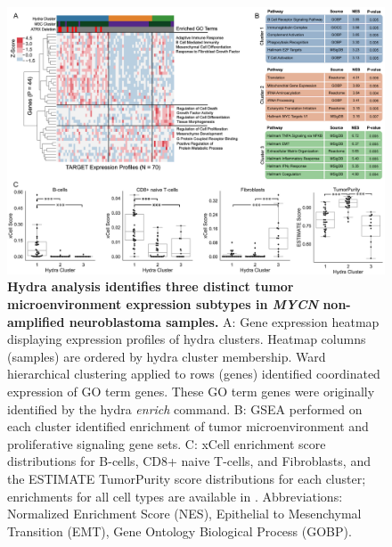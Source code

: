 \documentclass[10pt,letterpaper]{article}
\begin{document}
\begin{figure}[!h]
	\includegraphics[width=\textwidth]{img/PNG/MYCN-NA-Figure-V5@2x}
	\caption{{\bf Hydra analysis identifies three distinct tumor microenvironment expression subtypes in \textit{MYCN} non-amplified neuroblastoma samples.}
	A: Gene expression heatmap displaying expression profiles of hydra clusters. Heatmap columns (samples) are ordered by hydra cluster membership. Ward hierarchical clustering applied to rows (genes) identified coordinated expression of GO term genes. These GO term genes were originally identified by the hydra \textit{enrich} command. B: GSEA performed on each cluster identified enrichment of tumor microenvironment and proliferative signaling gene sets. C: xCell enrichment score distributions for B-cells, CD8+ naive T-cells, and Fibroblasts, and the ESTIMATE TumorPurity score distributions for each cluster; enrichments for all cell types are available in . Abbreviations: Normalized Enrichment Score (NES), Epithelial to Mesenchymal Transition (EMT), Gene Ontology Biological Process (GOBP).
	\label{MYCN-NA}}
\end{figure}
\end{document}
